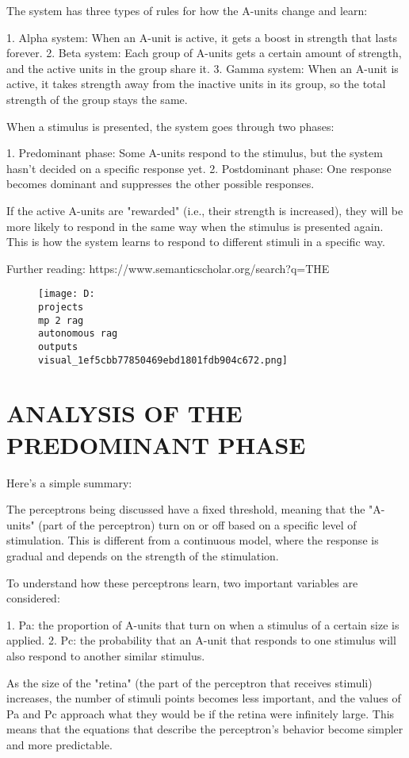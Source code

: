 \documentclass[12pt,a4paper]{article}
\begin{document}
The system has three types of rules for how the A-units change and learn:

1. Alpha system: When an A-unit is active, it gets a boost in strength that lasts forever.
2. Beta system: Each group of A-units gets a certain amount of strength, and the active units in the group share it.
3. Gamma system: When an A-unit is active, it takes strength away from the inactive units in its group, so the total strength of the group stays the same.

When a stimulus is presented, the system goes through two phases:

1. Predominant phase: Some A-units respond to the stimulus, but the system hasn't decided on a specific response yet.
2. Postdominant phase: One response becomes dominant and suppresses the other possible responses.

If the active A-units are "rewarded" (i.e., their strength is increased), they will be more likely to respond in the same way when the stimulus is presented again. This is how the system learns to respond to different stimuli in a specific way.

Further reading: https://www.semanticscholar.org/search?q=THE%
\begin{figure}[h]
\centering
\texttt{[image: D:\\projects\\mp 2 rag\\autonomous rag\\outputs\\visual\_1ef5cbb77850469ebd1801fdb904c672.png]}
\end{figure}
\section{ANALYSIS OF THE PREDOMINANT
PHASE}
Here's a simple summary:

The perceptrons being discussed have a fixed threshold, meaning that the "A-units" (part of the perceptron) turn on or off based on a specific level of stimulation. This is different from a continuous model, where the response is gradual and depends on the strength of the stimulation.

To understand how these perceptrons learn, two important variables are considered:

1. Pa: the proportion of A-units that turn on when a stimulus of a certain size is applied.
2. Pc: the probability that an A-unit that responds to one stimulus will also respond to another similar stimulus.

As the size of the "retina" (the part of the perceptron that receives stimuli) increases, the number of stimuli points becomes less important, and the values of Pa and Pc approach what they would be if the retina were infinitely large. This means that the equations that describe the perceptron's behavior become simpler and more predictable.
\end{document}
